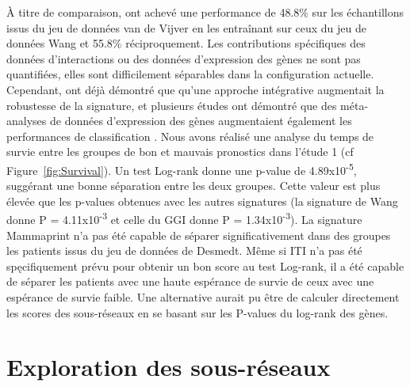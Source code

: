 		À titre de comparaison, \citet{Chuang2007} ont achevé une performance de 48.8\% sur les échantillons issus du jeu de données van de Vijver en les entraînant sur ceux du jeu de données Wang et 55.8\% réciproquement.
		Les contributions spécifiques des données d'interactions ou des données d'expression des gènes ne sont pas quantifiées, elles sont difficilement séparables dans la configuration actuelle.
		Cependant, \citet{Chuang2007} ont déjà démontré que qu'une approche intégrative augmentait la robustesse de la signature, et plusieurs études ont démontré que des méta-analyses de données d'expression des gènes augmentaient également les performances de classification \citep{Fishel2007,Xu2005}.
		Nous avons réalisé une analyse du temps de survie entre les groupes de bon et mauvais pronostics dans l'étude 1 (cf Figure~\ref{fig:Survival}).
		Un test Log-rank donne une p-value de 4.89x10\textsuperscript{-5}, suggérant une bonne séparation entre les deux groupes.
		Cette valeur est plus élevée que les p-values obtenues avec les autres signatures (la signature de Wang donne P = 4.11x10\textsuperscript{-3} et celle du GGI donne P = 1.34x10\textsuperscript{-3}).
		La signature Mammaprint n'a pas été capable de séparer significativement dans des groupes les patients issus du jeu de données de Desmedt.
		Même si ITI n'a pas été spęcifiquement prévu pour obtenir un bon score au test Log-rank, il a été capable de séparer les patients avec une haute espérance de survie de ceux avec une espérance de survie faible.
		Une alternative aurait pu être de calculer directement les scores des sous-réseaux en se basant sur les P-values du log-rank des gènes.

		\section{\textcolor{green!45!black}{Exploration des sous-réseaux}}

